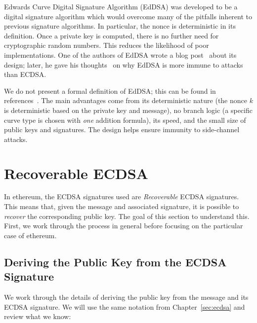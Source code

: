 Edwards Curve Digital Signature Algorithm (EdDSA)
was developed to be a digital signature algorithm which would
overcome many of the pitfalls inherent to previous signature algorithms.
In particular, the \gls{nonce} is deterministic in its definition.
Once a private key is computed, there is no further need
for cryptographic random numbers.
This reduces the likelihood of poor implementations.
One of the authors of EdDSA wrote a blog post~\cite{BernsteinBlog2014}
about its design;
later, he gave his thoughts~\cite{BernsteinBlog2019}
on why EdDSA is more immune to attacks than ECDSA.

We do not present a formal definition of EdDSA;
this can be found in references~\cite{ed25519,moreEdDSA,rfc8032}.
The main advantages come from its deterministic nature
(the \gls{nonce} $k$ is deterministic based on the private key and message),
no branch logic (a specific curve type is chosen with \emph{one}
addition formula),
its speed, and the small size of public keys and signatures.
The design helps ensure immunity to side-channel attacks.



\section{Recoverable ECDSA}
\label{sec:recoverable_ecdsa}

In \gls{ethereum}, the ECDSA signatures used are \emph{Recoverable}
ECDSA signatures.
This means that, given the message and associated signature,
it is possible to \emph{recover} the corresponding public key.
The goal of this section to understand this.
First, we work through the process in general before focusing
on the particular case of \gls{ethereum}.

\subsection{Deriving the Public Key from the ECDSA Signature}

We work through the details of deriving the public key from
the message and its ECDSA signature.
We will use the same notation from Chapter~\ref{sec:ecdsa}
and review what we know:

